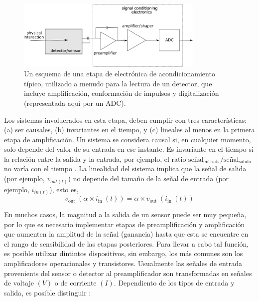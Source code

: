 \documentclass[]{book}
\begin{document}
\begin{figure}[h]
    \centering
    \includegraphics[width=0.8\textwidth]{front-end.png}
    \caption{Un esquema de una etapa de electrónica de acondicionamiento típico, utilizado a menudo para la lectura de un detector, que incluye amplificación, conformación de impulsos y digitalización (representada aquí por un ADC).}
    \label{fig:generic_frontend}

\end{figure}

\noindent Los sistemas involucrados en esta etapa, deben cumplir con tres características: (a) ser causales, (b) invariantes en el tiempo, y (c) lineales al menos en la primera etapa de amplificación. Un sistema se considera causal si, en cualquier momento, solo depende del valor de su entrada en ese instante. Es invariante en el tiempo si la relación entre la salida y la entrada, por ejemplo, el ratio $\text{señal}_{\text{entrada}}/\text{señal}_{\text{salida}}$ no varía con el tiempo \cite{kolanoski2020particle}. La linealidad del sistema implica que la señal de salida (por ejemplo, $v_{out(t)}$) no depende del tamaño de la señal de entrada (por ejemplo, $i_{in(t)}$), esto es, 
\begin{equation}
    v_{\text {out }}\left(\alpha \times i_{\text {in }}(t)\right)=\alpha \times v_{\text {out }}\left(i_{\text {in }}(t)\right)
\end{equation}

\noindent En muchos casos, la magnitud a la salida de un sensor puede ser muy pequeña, por lo que es necesario implementar etapas de preamplificación y amplificación que aumenten la amplitud de la señal (ganancia) hasta que esta se encuentre en el rango de sensibilidad de las etapas posteriores. Para llevar a cabo tal función, es posible utilizar dintintos dispositivos, sin embargo, los más comunes son los amplificadores operacionales y transistores. Usualmente las señales de entrada provenients del sensor o detector al preamplificador son transformadas en señales de voltaje $(V)$ o de corriente $(I)$. Dependiento de los tipos de entrada y salida, es posible distinguir \cite{kolanoski2020particle}:
\end{document}
